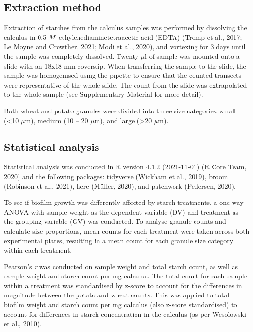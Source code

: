 \documentclass[utf8]{frontiers/frontiersSCNS}
\begin{document}
\hypertarget{extraction-method}{%
\subsection{Extraction method}\label{extraction-method}}

Extraction of starches from the calculus samples was performed by dissolving the
calculus in 0.5 \(\tiny{M}\) ethylenediaminetetraacetic acid (EDTA)
(Tromp et al., 2017; Le Moyne and Crowther, 2021; Modi et al., 2020),
and vortexing for 3 days until the sample was completely dissolved.
Twenty \(\mu\)l of sample was mounted onto a slide with an 18x18 mm coverslip.
When transferring the sample to the slide, the sample was homogenised using
the pipette to ensure that the counted transects were representative of the
whole slide. The count from the slide was extrapolated to the whole sample
(see Supplementary Material for more detail).

Both wheat and potato granules were divided into three size categories:
small (\textless10 \(\mu\)m), medium (10 -- 20 \(\mu\)m), and large (\textgreater20 \(\mu\)m).

\hypertarget{statistical-analysis}{%
\subsection{Statistical analysis}\label{statistical-analysis}}

Statistical analysis was conducted in R version 4.1.2 (2021-11-01) (R Core Team, 2020) and
the following packages: tidyverse (Wickham et al., 2019), broom (Robinson et al., 2021),
here (Müller, 2020), and patchwork (Pedersen, 2020).

To see if biofilm growth was differently affected by starch treatments, a
one-way ANOVA with sample weight as the dependent variable (DV) and treatment
as the grouping variable (GV) was conducted.
To analyse granule counts and calculate size proportions, mean counts for each
treatment were taken across
both experimental plates, resulting in a mean count for each
granule size category within each treatment.

Pearson's \emph{r} was conducted on sample weight and total starch count, as well as sample
weight and starch count per mg calculus. The total count for each sample within a
treatment was standardised by z-score to account for the differences in magnitude
between the potato and wheat counts.
This was applied to total biofilm weight and starch count per mg
calculus (also z-score standardised) to account for differences in starch
concentration in the calculus (as per Wesolowski et al., 2010).
\end{document}
